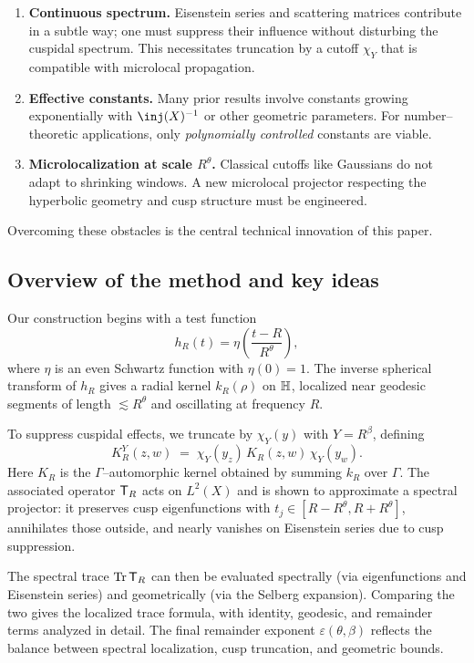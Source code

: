 \begin{enumerate}
  \item \textbf{Continuous spectrum.} Eisenstein series and scattering matrices contribute
        in a subtle way; one must suppress their influence without disturbing the cuspidal
        spectrum. This necessitates truncation by a cutoff $\chi_Y$ that is compatible
        with microlocal propagation.
  \item \textbf{Effective constants.} Many prior results involve constants growing
        exponentially with $\inj(X)^{-1}$ or other geometric parameters. For
        number–theoretic applications, only \emph{polynomially controlled} constants are
        viable.
  \item \textbf{Microlocalization at scale $R^\theta$.} Classical cutoffs like Gaussians
        do not adapt to shrinking windows. A new microlocal projector respecting the
        hyperbolic geometry and cusp structure must be engineered.
\end{enumerate}

Overcoming these obstacles is the central technical innovation of this paper.

\subsection{Overview of the method and key ideas}\label{subsec:method}

Our construction begins with a test function
\[
   h_R(t) = \eta\!\left(\frac{t-R}{R^\theta}\right),
\]
where $\eta$ is an even Schwartz function with $\eta(0)=1$. The inverse spherical
transform of $h_R$ gives a radial kernel $k_R(\rho)$ on $\mathbb{H}$, localized near geodesic
segments of length $\lesssim R^\theta$ and oscillating at frequency $R$.

To suppress cuspidal effects, we truncate by $\chi_Y(y)$ with $Y=R^\beta$, defining
\[
   K_R^Y(z,w) \;=\; \chi_Y(y_z)\,K_R(z,w)\,\chi_Y(y_w).
\]
Here $K_R$ is the $\Gamma$–automorphic kernel obtained by summing $k_R$ over $\Gamma$.
The associated operator $\mathsf{T}_R$ acts on $L^2(X)$ and is shown to approximate a spectral
projector: it preserves cusp eigenfunctions with $t_j \in [R-R^\theta,R+R^\theta]$,
annihilates those outside, and nearly vanishes on Eisenstein series due to cusp
suppression.

The spectral trace $\mathrm{Tr}\,\mathsf{T}_R$ can then be evaluated spectrally (via eigenfunctions and
Eisenstein series) and geometrically (via the Selberg expansion). Comparing the two gives
the localized trace formula, with identity, geodesic, and remainder terms analyzed in
detail. The final remainder exponent $\varepsilon(\theta,\beta)$ reflects the balance
between spectral localization, cusp truncation, and geometric bounds.

